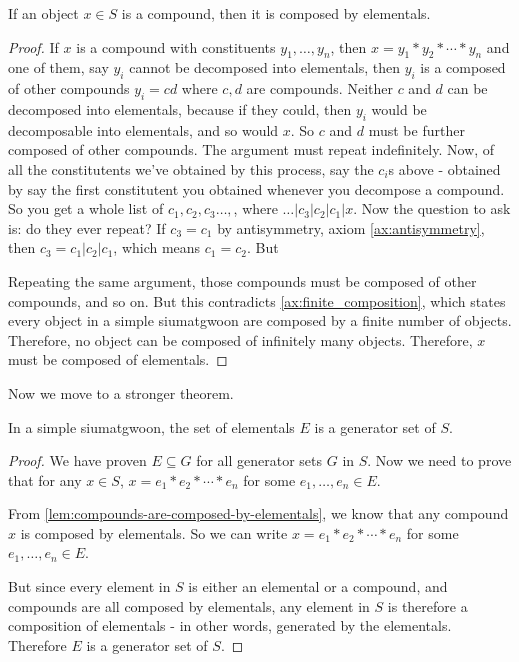 \begin{lemma}\label{lem:compounds-are-composed-by-elementals}
    If an object $x\in S$ is a compound, then it is composed by elementals.
\end{lemma}
\begin{proof}
    If $x$ is a compound with constituents $y_1, \dots, y_n$, then $x = y_1 * y_2 * \cdots * y_n$ and one of them, say $y_i$ cannot be decomposed into elementals, then $y_i$ is a composed of other compounds $y_i =cd$ where $c,d$ are compounds. Neither $c$ and $d$ can be decomposed into elementals, because if they could, then $y_i$ would be decomposable into elementals, and so would $x$. So $c$ and $d$ must be further composed of other compounds. 
    The argument must repeat indefinitely. Now, of all the constitutents we've obtained by this process, say the $c_i$s above - obtained by say the first constitutent you obtained whenever you decompose a compound. So you get a whole list of $c_1, c_2, c_3 \ldots,$, where $\ldots |c_3 |c_2 |c_1 |x$. Now the question to ask is: do they ever repeat? If $c_3 = c_1$ by antisymmetry, axiom \ref{ax:antisymmetry}, then $c_3 = c_1|c_2|c_1$, which means $c_1=c_2$. But 




    Repeating the same argument, those compounds must be composed of other compounds, and so on. But this contradicts \ref{ax:finite_composition}, which states every object in a simple siumatgwoon are composed by a finite number of objects. Therefore, no object can be composed of infinitely many objects. Therefore, $x$ must be composed of elementals.
\end{proof}


Now we move to a stronger theorem.

\begin{theorem}\label{thm:elementals-are-a-generator-set-in-simple-siumatgwoons} 
    In a simple siumatgwoon, the set of elementals $E$ is a generator set of $S$.
\end{theorem}

\begin{proof}
    We have proven $E\subseteq G$ for all generator sets $G$ in $S$. Now we need to prove that for any $x\in S$, $x = e_1 * e_2 * \cdots * e_n$ for some $e_1, \dots, e_n \in E$.

    From \ref{lem:compounds-are-composed-by-elementals}, we know that any compound $x$ is composed by elementals. So we can write $x = e_1 * e_2 * \cdots * e_n$ for some $e_1, \dots, e_n \in E$.

    But since every element in $S$ is either an elemental or a compound, and compounds are all composed by elementals, any element in $S$ is therefore a composition of elementals - in other words, generated by the elementals. Therefore $E$ is a generator set of $S$.
\end{proof}



